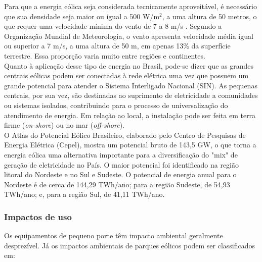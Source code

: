 Para que a energia e\'olica seja considerada tecnicamente aproveit\'avel, \'e necess\'ario que sua densidade seja maior ou igual a 500 W/m$^{2}$, a uma altura de 50 metros, o que requer uma velocidade m\'inima do vento de 7 a 8 m/s \cite{johansson1993renewable} . Segundo a Organiza\c{c}\~ao Mundial de Meteorologia, o vento apresenta velocidade m\'edia igual ou superior a 7 m/s, a uma altura de 50 m, em apenas 13\% da superf\'icie terrestre. Essa propor\c{c}\~ao varia muito entre regi\~oes e continentes. \\

Quanto \`a aplica\c{c}\~ao desse tipo de energia no Brasil, pode-se dizer que as grandes centrais e\'olicas podem ser conectadas \`a rede el\'etrica uma vez que possuem um grande potencial para atender o Sistema Interligado Nacional (SIN). As pequenas centrais, por sua vez, s\~ao destinadas ao suprimento de eletricidade a comunidades ou sistemas isolados, contribuindo para o processo de universaliza\c{c}\~ao do atendimento de energia. Em rela\c{c}\~ao ao local, a instala\c{c}\~ao pode ser feita em terra firme (\textit{on-shore}) ou no mar (\textit{off-shore}). \\ 

O Atlas do Potencial E\'olico Brasileiro, elaborado pelo Centro de Pesquisas de Energia El\'etrica (Cepel), mostra um potencial bruto de 143,5 GW, o que torna a energia e\'olica uma alternativa importante para a diversifica\c{c}\~ao do "mix" de gera\c{c}\~ao de eletricidade no Pa\'is. O maior potencial foi identificado na regi\~ao litoral do Nordeste e no Sul e Sudeste. O potencial de energia anual para o Nordeste \'e de cerca de 144,29 TWh/ano; para a regi\~ao Sudeste, de 54,93 TWh/ano; e, para a regi\~ao Sul, de 41,11 TWh/ano. \\

\subsubsection{Impactos de uso}

Os equipamentos de pequeno porte t\^em impacto ambiental geralmente desprez\'ivel. J\'a os impactos ambientais de parques e\'olicos podem ser classificados em:

